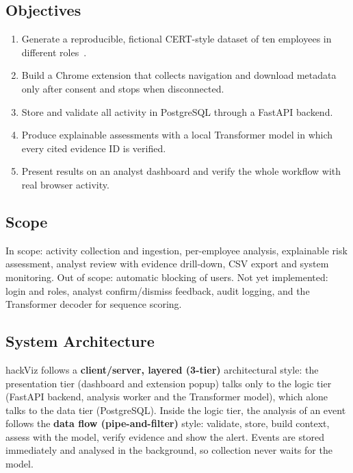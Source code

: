 \documentclass[openany]{tietreport}
\begin{document}
\subsection{Objectives}

\begin{enumerate}
  \item Generate a reproducible, fictional CERT-style dataset of ten employees in different
    roles~\cite{glasser2013bridging}.
  \item Build a Chrome extension that collects navigation and download metadata only after consent and
    stops when disconnected.
  \item Store and validate all activity in PostgreSQL through a FastAPI backend.
  \item Produce explainable assessments with a local Transformer model in which every cited evidence ID
    is verified.
  \item Present results on an analyst dashboard and verify the whole workflow with real browser activity.
\end{enumerate}

\subsection{Scope}
\label{sec:scope}

In scope: activity collection and ingestion, per-employee analysis, explainable risk assessment,
analyst review with evidence drill-down, CSV export and system monitoring. Out of scope: automatic
blocking of users. Not yet implemented: login and roles, analyst confirm/dismiss feedback, audit
logging, and the Transformer decoder for sequence scoring.

\subsection{System Architecture}
\label{sec:arch}

hackViz follows a \textbf{client/server, layered (3-tier)} architectural style: the presentation tier
(dashboard and extension popup) talks only to the logic tier (FastAPI backend, analysis worker and the
Transformer model), which alone talks to the data tier (PostgreSQL). Inside the logic tier, the analysis
of an event follows the \textbf{data flow (pipe-and-filter)} style: validate, store, build context, assess
with the model, verify evidence and show the alert. Events are stored immediately and analysed in the
background, so collection never waits for the model.
\end{document}
